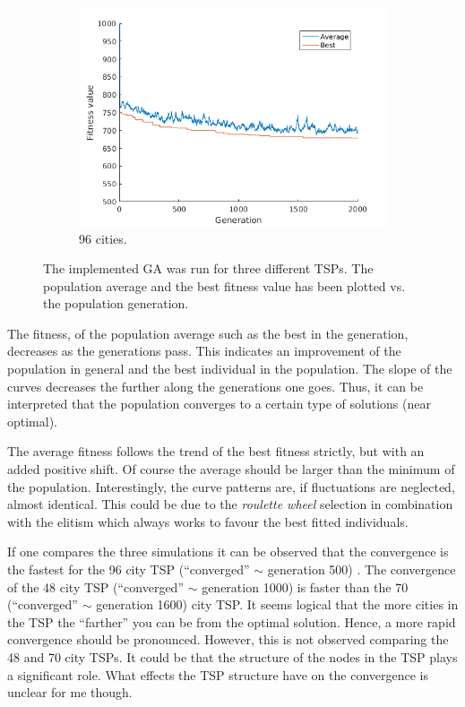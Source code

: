 \documentclass[]{article}
\begin{document}
\begin{figure}[H]
  \begin{subfigure}{\textwidth}
     \centering
     \includegraphics[width=0.5\linewidth]{../GA_TSP/t196.png}
     \caption{96 cities.}
     \label{sfig:t196}
  \end{subfigure}%
  \caption{The implemented GA was run for three different TSPs. The population average and the best fitness value has been plotted vs. the population generation.}
  \label{fig:task1}
\end{figure}


The fitness, of the population average such as the best in the generation, decreases as the generations pass.
This indicates an improvement of the population in general and the best individual in the population.
The slope of the curves decreases the further along the generations one goes.
Thus, it can be interpreted that the population converges to a certain type of solutions (near optimal).

The average fitness follows the trend of the best fitness strictly, but with an added positive shift.
Of course the average should be larger than the minimum of the population.
Interestingly, the curve patterns are, if fluctuations are neglected, almost identical.
This could be due to the {\it roulette wheel} selection in combination with the elitism which always works to favour the best fitted individuals.

If one compares the three simulations it can be observed that the convergence is the fastest for the 96 city TSP (``converged'' $\sim$ generation 500) .
The convergence of the 48 city TSP (``converged'' $\sim$ generation 1000) is faster than the 70 (``converged'' $\sim$ generation 1600) city TSP.
It seems logical that the more cities in the TSP the ``farther'' you can be from the optimal solution.
Hence, a more rapid convergence should be pronounced.
However, this is not observed comparing the 48 and 70 city TSPs.
It could be that the structure of the nodes in the TSP plays a significant role.
What effects the TSP structure have on the convergence is unclear for me though.
\end{document}
